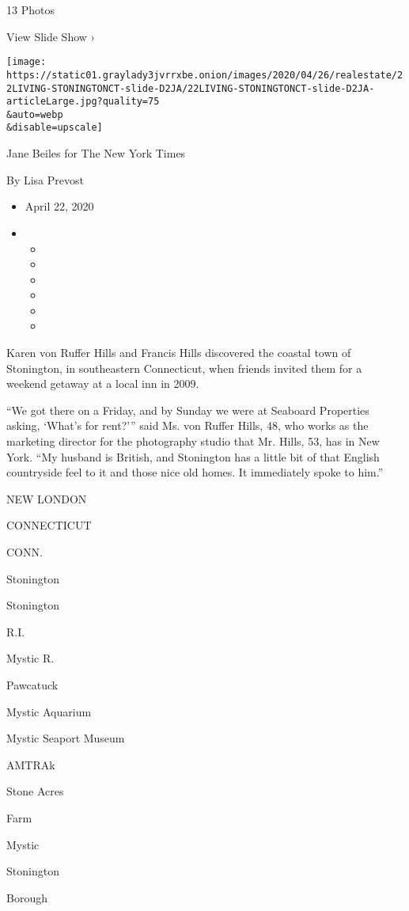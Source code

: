 13 Photos

View Slide Show ›

\texttt{[image: https://static01.graylady3jvrrxbe.onion/images/2020/04/26/realestate/22LIVING-STONINGTONCT-slide-D2JA/22LIVING-STONINGTONCT-slide-D2JA-articleLarge.jpg?quality=75\\\&auto=webp\\\&disable=upscale]}

Jane Beiles for The New York Times

By Lisa Prevost

\begin{itemize}
\item
  April 22, 2020
\item
  \begin{itemize}
  \item
  \item
  \item
  \item
  \item
  \item
  \end{itemize}
\end{itemize}

Karen von Ruffer Hills and Francis Hills discovered the coastal town of
Stonington, in southeastern Connecticut, when friends invited them for a
weekend getaway at a local inn in 2009.

``We got there on a Friday, and by Sunday we were at Seaboard Properties
asking, `What's for rent?''' said Ms. von Ruffer Hills, 48, who works as
the marketing director for the photography studio that Mr. Hills, 53,
has in New York. ``My husband is British, and Stonington has a little
bit of that English countryside feel to it and those nice old homes. It
immediately spoke to him.''

NEW LONDON

CONNECTICUT

CONN.

Stonington

Stonington

R.I.

Mystic R.

Pawcatuck

Mystic Aquarium

Mystic Seaport Museum ~

AMTRAk

Stone Acres

Farm

Mystic

Stonington

Borough

